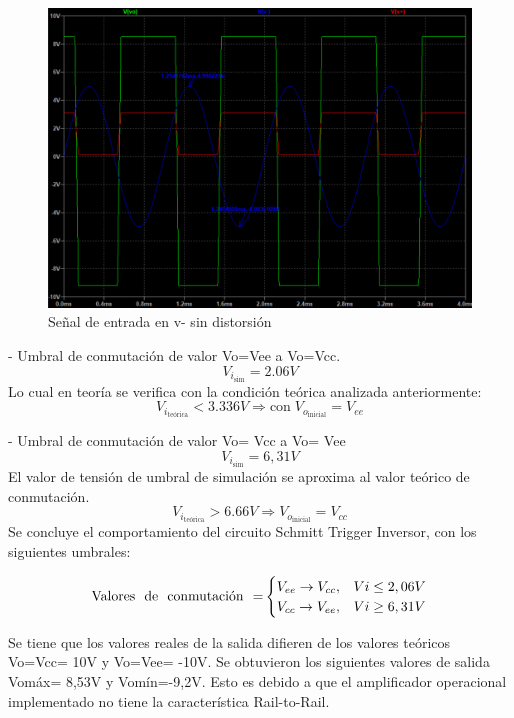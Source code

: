 \begin{figure}[H]
    \centering
    \includegraphics[width=1.0\linewidth]{Secciones/Circuito4/Circuito 4 - Vi no atenuada.png}
    \caption{Señal de entrada en v- sin distorsión}
    \label{fig:ViNoAtenuada}
\end{figure}
- Umbral de conmutación de valor Vo=Vee a Vo=Vcc. 
\[V_{i_{\text{sim}}}= 2.06V\]
Lo cual en teoría se verifica con la condición teórica analizada anteriormente:
\[V_{i_{\text{teórica}}} < 3.336V \Rightarrow \text{con} \; V_{o_{\text{inicial}}} = V_{ee}\]

- Umbral de conmutación de valor Vo= Vcc a Vo= Vee 
\[V_{i_{\text{sim}}}= 6,31V\]
El valor de tensión de umbral de simulación se aproxima al valor teórico de conmutación.
\[V_{i_{\text{teórica}}} > 6.66V \Rightarrow V_{o_{\text{inicial}}}= V_{cc} \]
Se concluye el comportamiento del circuito Schmitt Trigger Inversor, con los siguientes umbrales:

\begin{equation}
    \text{Valores \space de \space conmutación \space =}
    \begin{cases}
      V_{ee} \rightarrow V_{cc}, &  Vi\leq2,06V \\
      V_{cc} \rightarrow V_{ee}, &  Vi\geq6,31V
    \end{cases}
  \end{equation}

Se tiene que los valores reales de la salida difieren de los valores teóricos Vo=Vcc= 10V y Vo=Vee= -10V. Se obtuvieron los siguientes valores de salida Vomáx= 8,53V y Vomín=-9,2V.  Esto es debido a que el amplificador operacional implementado no tiene la característica Rail-to-Rail. 


